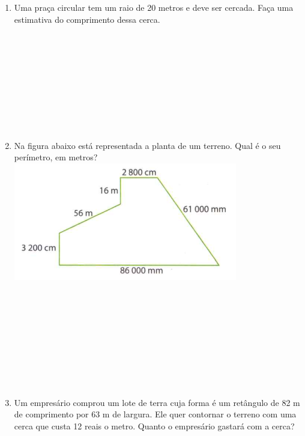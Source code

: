 \documentclass[a4paper,14pt]{article}
\begin{document}
\begin{multicols}{2}
\begin{enumerate}
			\item Uma praça circular tem um raio de 20 metros e deve ser cercada. Faça uma estimativa do comprimento dessa cerca. \\\\\\\\\\\\\\\\\\\\
			\item Na figura abaixo está representada a planta de um terreno. Qual é o seu perímetro, em metros? \\
			\includegraphics[width=1\linewidth]{6FMA28_imagens/imagem4} \\\\\\\\\\\\\\\\\\\\
			\item Um empresário comprou um lote de terra cuja forma é um retângulo de 82 m de comprimento por 63 m de largura. Ele quer contornar o terreno com uma cerca que custa 12 reais o metro. Quanto o empresário gastará com a cerca?  \\\\\\\\\\\\\\\\\\\\

\end{enumerate}
\end{multicols}
\end{document}
